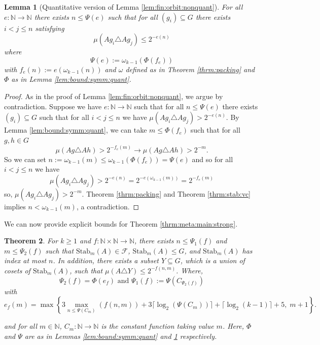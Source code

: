 \documentclass[11pt]{amsart}
\newtheorem{theorem}{Theorem}[section]
\newtheorem{lemma}[theorem]{Lemma}
\theoremstyle{definition}
\theoremstyle{remark}
\def\NN{\mathbb{N}}
\begin{document}
\begin{lemma}[Quantitative version of Lemma \ref{lem:fin:orbit:nonquant}]
\label{lem:fin:orbit:quant}
    For all $e: \NN \to \NN$ there exists $n \le \Psi(e)$ such that for all $(g_i) \subseteq G$ there exists $i < j \le n$ satisfying 
    \[
    \mu(Ag_i \triangle Ag_j) \le 2^{-e(n)}
    \]
    where 
    \[
    \Psi(e):=\omega_{k-1}(\Phi(f_e))
    \]
    with $f_e(n):= e(\omega_{k-1}(n))$ and $\omega$ defined as in Theorem \ref{thrm:packing} and $\Phi$ as in Lemma \ref{lem:bound:symm:quant}.
\end{lemma}
\begin{proof}
    As in the proof of Lemma \ref{lem:fin:orbit:nonquant}, we argue by contradiction. Suppose we have $e: \NN \to \NN$ such that for all $n \le \Psi(e)$ there exists $(g_i) \subseteq G$ such that for all $i<j\le n$ we have $\mu(Ag_i \triangle Ag_j) > 2^{-e(n)}$. By Lemma \ref{lem:bound:symm:quant}, we can take $m \le \Phi(f_e)$ such that for all $g, h \in G$
        \[
    \mu(Ag \triangle Ah) > 2^{-f_e(m)} \to \mu(Ag \triangle Ah)>2^{-m}.
    \]
    So we can set $n:= \omega_{k-1}(m) \le \omega_{k-1}(\Phi(f_e)) = \Psi(e)$ and so for all $i<j\le n$ we have 
    \[
    \mu(Ag_i \triangle Ag_j) > 2^{-e(n)} = 2^{-e(\omega_{k-1}(m))} = 2^{-f_e(m)}
    \]
    so, $\mu(Ag_i \triangle Ag_j) >  2^{-m}$. Theorem \ref{thrm:packing} and Theorem \ref{thrm:stab:vc} implies $n < \omega_{k-1}(m)$, a contradiction.
\end{proof}
We can now  provide explicit bounds for Theorem  \ref{thrm:meta:main:strong}.
\begin{theorem}
    For $k \ge 1$ and $f:\NN \times \NN \to \NN$, there exists  $n \le \Psi_1(f) $ and $m \le \Psi_2(f)$ such that  $\mathrm{Stab}_m(A) \in \mathcal{F}$, $\mathrm{Stab}_m(A) \le G$, and $\mathrm{Stab}_m(A)$ has index at most $n$. In addition,  there exists a subset $Y \subseteq G$, which is a union of cosets of $\mathrm{Stab}_m(A)$, such that $\mu(A \triangle Y ) \le 2^{-f(n,m)}$. Where,
    \[
    \Psi_2(f) = \Phi(e_f) \mbox{ and } \Psi_1(f):=\Psi\left(C_{\Psi_2(f)}\right) 
    \]
    with  
    \[
    e_f(m) =
    \max\left\{ 3\max_{n \le \Psi(C_m)}(f(n,m))+3\lceil\log_2 (\Psi(C_m))\rceil+\lceil\log_2(k-1)\rceil+5,\;m+1\right\}.
   \]

    and  for all $m \in \NN$, $C_m : \NN \to \NN$ is the constant function taking value $m$. Here, $\Phi$ and $\Psi$ are as in Lemmas \ref{lem:bound:symm:quant} and \ref{lem:fin:orbit:quant} respectively. 
\end{theorem}
\end{document}
